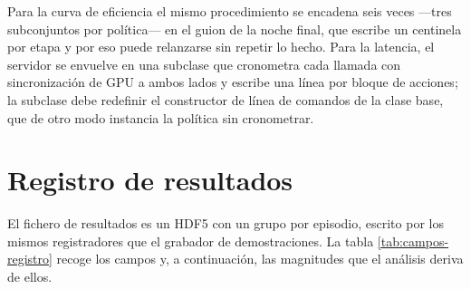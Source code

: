 Para la curva de eficiencia el mismo procedimiento se encadena seis veces —tres subconjuntos por
política— en el guion de la noche final, que escribe un centinela por etapa y por eso puede
relanzarse sin repetir lo hecho. Para la latencia, el servidor se envuelve en una subclase que
cronometra cada llamada con sincronización de GPU a ambos lados y escribe una línea por bloque de
acciones; la subclase debe redefinir el constructor de línea de comandos de la clase base, que de
otro modo instancia la política sin cronometrar.

\section{Registro de resultados}

El fichero de resultados es un HDF5 con un grupo por episodio, escrito por los mismos registradores
que el grabador de demostraciones. La tabla \ref{tab:campos-registro} recoge los campos y, a
continuación, las magnitudes que el análisis deriva de ellos.

\begin{table}[ht]
	\centering
	\caption{Campos registrados por episodio}
	\label{tab:campos-registro}
\end{table}

